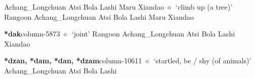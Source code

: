 \hspace{1ex}
         Achang\_Longchuan 
\hspace{1ex}
         Atsi 
\hspace{1ex}
         Bola 
\hspace{1ex}
         Lashi 
\hspace{1ex}
         Maru 
\hspace{1ex}
         Xiandao 
\hspace{1ex}
         $\diamond$~`climb up (a tree)'
         Rangoon 
\hspace{1ex}
         Achang\_Longchuan 
\hspace{1ex}
         Atsi 
\hspace{1ex}
         Bola 
\hspace{1ex}
         Lashi 
\hspace{1ex}
         Maru 
\hspace{1ex}
         Xiandao 
  \item {\footnotesize \textbf{*dak}}{\tiny column-5873}
         $\diamond$~`joint'
         Rangoon 
\hspace{1ex}
         Achang\_Longchuan 
\hspace{1ex}
         Atsi 
\hspace{1ex}
         Bola 
\hspace{1ex}
         Lashi 
\hspace{1ex}
         Xiandao 
  \item {\footnotesize \textbf{*dzan, *dam, *dan, *dzam}}{\tiny column-10611}
         $\diamond$~`startled, be / shy (of animals)'
         Achang\_Longchuan 
\hspace{1ex}
         Atsi 
\hspace{1ex}
         Bola 
\hspace{1ex}
         Lashi 
